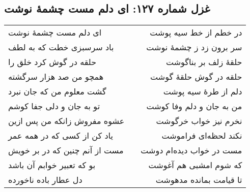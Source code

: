 \begin{center}
\section*{غزل شماره ۱۲۷: ای دلم مست چشمهٔ نوشت}
\label{sec:127}
\begin{longtable}{l p{0.5cm} r}
ای دلم مست چشمهٔ نوشت
&&
در خطم از خط سیه پوشت
\\
باد سرسبزی خطت که به لطف
&&
سر برون زد ز چشمهٔ نوشت
\\
حلقه در گوش کرد خلق را
&&
حلقهٔ زلف بر بناگوشت
\\
همچو من صد هزار سرگشته
&&
حلقه در گوش حلقهٔ گوشت
\\
گشت معلوم من که جان نبرد
&&
دلم از طرهٔ سیه پوشت
\\
تو به جان و دلی جفا کوشم
&&
من به جان و دلم وفا کوشت
\\
عشوه مفروش زانکه من پس ازین
&&
نخرم نیز خواب خرگوشت
\\
یاد کن از کسی که در همه عمر
&&
نکند لحظه‌ای فراموشت
\\
مست از آنم چنین که در بر خویش
&&
مست در خواب دیده‌ام دوشت
\\
بو که تعبیر خوابم آن باشد
&&
که شوم امشبی هم آغوشت
\\
دل عطار باده ناخورده
&&
تا قیامت بمانده مدهوشت
\\
\end{longtable}
\end{center}
